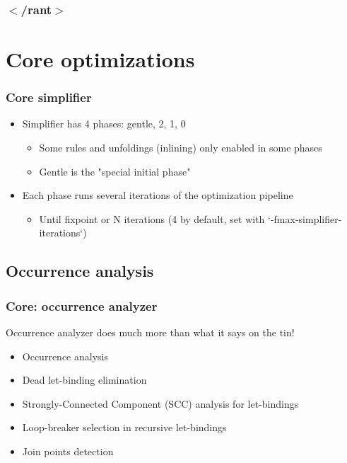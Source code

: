 \documentclass[aspectratio=169]{beamer}
\begin{document}
\begin{frame}
  \frametitle{$<$/rant$>$}
\end{frame}

\section{Core optimizations}

\begin{frame}
  \frametitle{Core simplifier}
  \begin{itemize}
    \item Simplifier has 4 phases: gentle, 2, 1, 0
      \begin{itemize}
        \item Some rules and unfoldings (inlining) only enabled in some phases
        \item Gentle is the "special initial phase"
      \end{itemize}
    \item Each phase runs several iterations of the optimization pipeline
      \begin{itemize}
        \item Until fixpoint or N iterations (4 by default, set with
          `-fmax-simplifier-iterations`)
      \end{itemize}
  \end{itemize}
\end{frame}

\subsection{Occurrence analysis}

\begin{frame}
  \frametitle{Core: occurrence analyzer}

  Occurrence analyzer does much more than what it says on the tin!

  \begin{itemize}
    \item Occurrence analysis
    \item Dead let-binding elimination
    \item Strongly-Connected Component (SCC) analysis for let-bindings
    \item Loop-breaker selection in recursive let-bindings
    \item Join points detection
  \end{itemize}
\end{frame}
\end{document}
